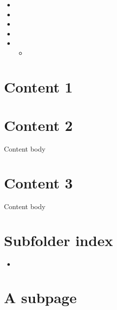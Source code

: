 

\pagestyle{empty}
\sphinxmaketitle
\pagestyle{plain}
\sphinxtableofcontents
\pagestyle{normal}
\label{\detokenize{index::doc}}


\sphinxAtStartPar
{}
\begin{itemize}
\item{} 

\item{} 

\item{} 

\item{} 
\sphinxAtStartPar
{}

\item{} 

\begin{itemize}
\item{} 

\end{itemize}
\end{itemize}


\chapter{Content 1}
\label{\detokenize{content1:content-1}}\label{\detokenize{content1::doc}}

\chapter{Content 2}
\label{\detokenize{content2:content-2}}\label{\detokenize{content2::doc}}
\sphinxAtStartPar
Content body


\chapter{Content 3}
\label{\detokenize{content3:content-3}}\label{\detokenize{content3::doc}}
\sphinxAtStartPar
Content body


\chapter{Subfolder index}
\label{\detokenize{subfolder/index:subfolder-index}}\label{\detokenize{subfolder/index::doc}}
\sphinxAtStartPar
{}
\begin{itemize}
\item{} 

\end{itemize}


\chapter{A subpage}
\label{\detokenize{subfolder/asubpage:a-subpage}}\label{\detokenize{subfolder/asubpage::doc}}






\renewcommand{\indexname}{Index}
\printindex
